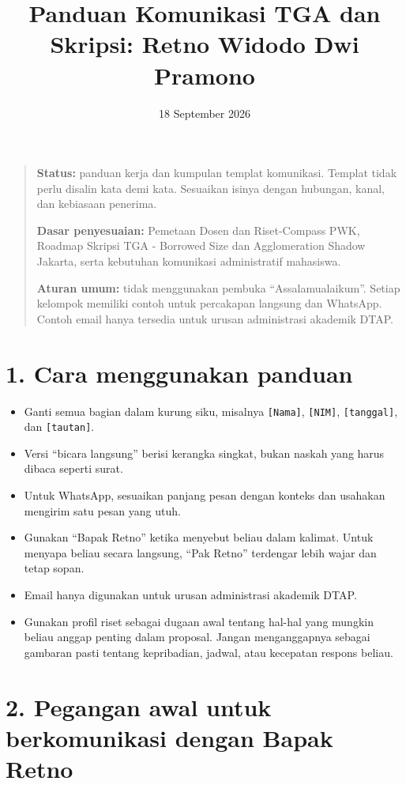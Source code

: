 \documentclass[
  indonesian,
]{article}
\title{Panduan Komunikasi TGA dan Skripsi: Retno Widodo Dwi Pramono}
\author{}
\date{18 September 2026}
\providecommand{\tightlist}{%
  \setlength{\itemsep}{0pt}\setlength{\parskip}{0pt}}
\begin{document}
\maketitle
\renewcommand*\contentsname{Daftar Isi}
\setcounter{tocdepth}{2}
\tableofcontents\clearpage
\begin{quote}
\textbf{Status:} panduan kerja dan kumpulan templat komunikasi. Templat
tidak perlu disalin kata demi kata. Sesuaikan isinya dengan hubungan,
kanal, dan kebiasaan penerima.

\textbf{Dasar penyesuaian:} Pemetaan Dosen dan Riset-Compass PWK,
Roadmap Skripsi TGA - Borrowed Size dan Agglomeration Shadow Jakarta,
serta kebutuhan komunikasi administratif mahasiswa.

\textbf{Aturan umum:} tidak menggunakan pembuka ``Assalamualaikum''.
Setiap kelompok memiliki contoh untuk percakapan langsung dan WhatsApp.
Contoh email hanya tersedia untuk urusan administrasi akademik DTAP.
\end{quote}

\section{1. Cara menggunakan panduan}\label{cara-menggunakan-panduan}

\begin{itemize}
\tightlist
\item
  Ganti semua bagian dalam kurung siku, misalnya \texttt{{[}Nama{]}},
  \texttt{{[}NIM{]}}, \texttt{{[}tanggal{]}}, dan \texttt{{[}tautan{]}}.
\item
  Versi ``bicara langsung'' berisi kerangka singkat, bukan naskah yang
  harus dibaca seperti surat.
\item
  Untuk WhatsApp, sesuaikan panjang pesan dengan konteks dan usahakan
  mengirim satu pesan yang utuh.
\item
  Gunakan ``Bapak Retno'' ketika menyebut beliau dalam kalimat. Untuk
  menyapa beliau secara langsung, ``Pak Retno'' terdengar lebih wajar
  dan tetap sopan.
\item
  Email hanya digunakan untuk urusan administrasi akademik DTAP.
\item
  Gunakan profil riset sebagai dugaan awal tentang hal-hal yang mungkin
  beliau anggap penting dalam proposal. Jangan menganggapnya sebagai
  gambaran pasti tentang kepribadian, jadwal, atau kecepatan respons
  beliau.
\end{itemize}

\section{2. Pegangan awal untuk berkomunikasi dengan Bapak
Retno}\label{pegangan-awal-untuk-berkomunikasi-dengan-bapak-retno}
\end{document}
